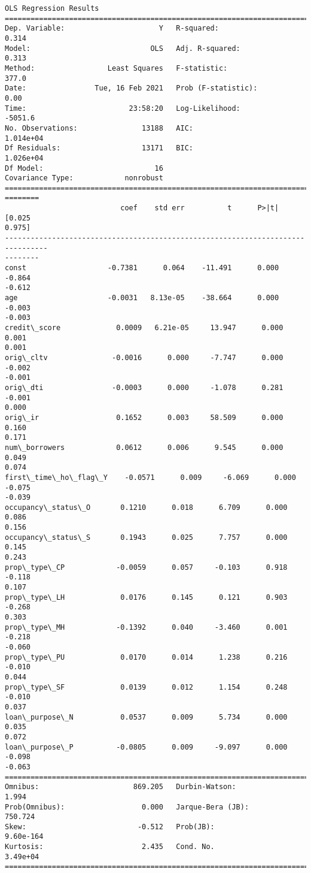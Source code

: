 \documentclass[11pt]{article}
\begin{document}
    \begin{Verbatim}[commandchars=\\\{\}]
                            OLS Regression Results
==============================================================================
Dep. Variable:                      Y   R-squared:                       0.314
Model:                            OLS   Adj. R-squared:                  0.313
Method:                 Least Squares   F-statistic:                     377.0
Date:                Tue, 16 Feb 2021   Prob (F-statistic):               0.00
Time:                        23:58:20   Log-Likelihood:                -5051.6
No. Observations:               13188   AIC:                         1.014e+04
Df Residuals:                   13171   BIC:                         1.026e+04
Df Model:                          16
Covariance Type:            nonrobust
================================================================================
========
                           coef    std err          t      P>|t|      [0.025
0.975]
--------------------------------------------------------------------------------
--------
const                   -0.7381      0.064    -11.491      0.000      -0.864
-0.612
age                     -0.0031   8.13e-05    -38.664      0.000      -0.003
-0.003
credit\_score             0.0009   6.21e-05     13.947      0.000       0.001
0.001
orig\_cltv               -0.0016      0.000     -7.747      0.000      -0.002
-0.001
orig\_dti                -0.0003      0.000     -1.078      0.281      -0.001
0.000
orig\_ir                  0.1652      0.003     58.509      0.000       0.160
0.171
num\_borrowers            0.0612      0.006      9.545      0.000       0.049
0.074
first\_time\_ho\_flag\_Y    -0.0571      0.009     -6.069      0.000      -0.075
-0.039
occupancy\_status\_O       0.1210      0.018      6.709      0.000       0.086
0.156
occupancy\_status\_S       0.1943      0.025      7.757      0.000       0.145
0.243
prop\_type\_CP            -0.0059      0.057     -0.103      0.918      -0.118
0.107
prop\_type\_LH             0.0176      0.145      0.121      0.903      -0.268
0.303
prop\_type\_MH            -0.1392      0.040     -3.460      0.001      -0.218
-0.060
prop\_type\_PU             0.0170      0.014      1.238      0.216      -0.010
0.044
prop\_type\_SF             0.0139      0.012      1.154      0.248      -0.010
0.037
loan\_purpose\_N           0.0537      0.009      5.734      0.000       0.035
0.072
loan\_purpose\_P          -0.0805      0.009     -9.097      0.000      -0.098
-0.063
==============================================================================
Omnibus:                      869.205   Durbin-Watson:                   1.994
Prob(Omnibus):                  0.000   Jarque-Bera (JB):              750.724
Skew:                          -0.512   Prob(JB):                    9.60e-164
Kurtosis:                       2.435   Cond. No.                     3.49e+04
==============================================================================


\end{Verbatim}
\end{document}
